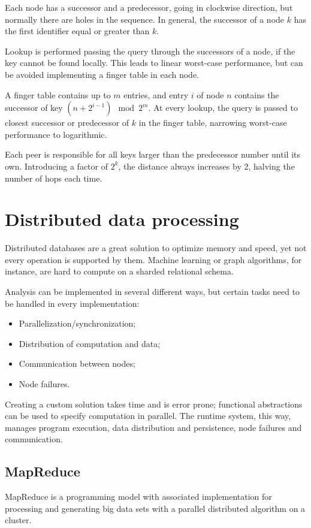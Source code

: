 Each node has a successor and a predecessor, going in clockwise direction, but normally there are holes in the sequence. In general, the successor of a node $k$ has the first identifier equal or greater than $k$.

Lookup is performed passing the query through the successors of a node, if the key cannot be found locally. This leads to linear worst-case performance, but can be avoided implementing a finger table in each node. 

A finger table contains up to $m$ entries, and entry $i$ of node $n$ contains the successor of key $(n + 2^{i-1}) \mod 2^m$. At every lookup, the query is passed to closest successor or predecessor of $k$ in the finger table, narrowing worst-case performance to logarithmic.

Each peer is responsible for all keys larger than the predecessor number until its own. Introducing a factor of $2^k$, the distance always increases by 2, halving the number of hops each time.

\section{Distributed data processing}
Distributed databases are a great solution to optimize memory and speed, yet not every operation is supported by them. Machine learning or graph algorithms, for instance, are hard to compute on a sharded relational schema.

Analysis can be implemented in several different ways, but certain tasks need to be handled in every implementation:
\begin{itemize}
	\item Parallelization/synchronization;
	\item Distribution of computation and data;
	\item Communication between nodes;
	\item Node failures.
\end{itemize}

Creating a custom solution takes time and is error prone; functional abstractions can be used to specify computation in parallel. The runtime system, this way, manages program execution, data distribution and persistence, node failures and communication.

\subsection{MapReduce}
MapReduce is a programming model with associated implementation for processing and generating big data sets with a parallel distributed algorithm on a cluster.

